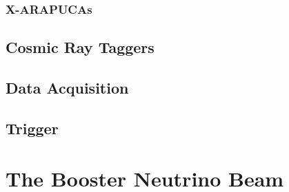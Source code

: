 \subsubsection{X-ARAPUCAs}

\subsection{Cosmic Ray Taggers}

\subsection{Data Acquisition}

\subsection{Trigger}


\section{The Booster Neutrino Beam}
